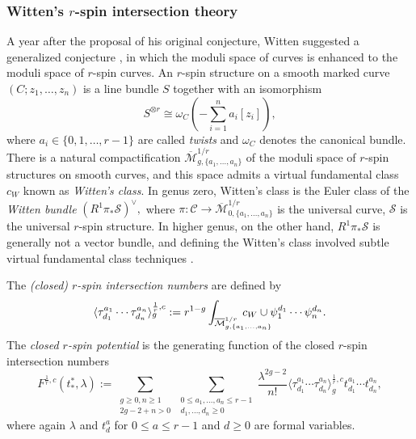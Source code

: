 \documentclass[11pt]{amsart}
\theoremstyle{definition}
\theoremstyle{remark}
\newcommand{\M}{\ensuremath{\overline{\mathcal{M}}}}
\newcommand{\<}{\left<}
\renewcommand{\>}{\right>}
\numberwithin{equation}{section}
\def\Mbar{{\overline{\mathcal M}}}
\begin{document}
\subsubsection{Witten's $r$-spin intersection theory}
A year after the proposal of his original conjecture, Witten suggested a generalized conjecture \cite{Witten93}, in which the moduli space of curves is enhanced to the moduli space of $r$-spin curves.  An $r$-spin structure on a smooth marked curve $(C;z_1, \ldots, z_n)$ is a line bundle $S$ together with an isomorphism
\[S^{\otimes r} \cong \omega_{C}\left(-\sum_{i=1}^n a_i[z_i]\right),\]
where $a_i \in \{0,1,\ldots, r-1\}$ are called \emph{twists} and $\omega_C$ denotes the canonical bundle.  There is a %
natural compactification $\Mbar_{g,\{a_1, \ldots, a_n\}}^{1/r}$ of the %
moduli space of $r$-spin structures on smooth curves, and this space admits a virtual fundamental class $c_W$ known as \emph{Witten's class}. In genus zero, Witten's class is the Euler class of the \emph{Witten bundle} $(R^1\pi_*\mathcal{S})^{\vee},$ where $\pi: \mathcal{C} \rightarrow \Mbar_{0,\{a_1, \ldots, a_n\}}^{1/r}$ is the %
universal curve, $\mathcal{S}$ %
is the universal $r$-spin structure.  In higher genus, on the other hand, $R^1\pi_*\mathcal{S}$ is generally not a vector bundle, and defining the Witten's class involved subtle virtual fundamental class %
techniques \cite{PV,ChiodoWitten,Moc06,FJR,CLL}.

The %
{\it (closed) $r$-spin intersection numbers} are defined by
\begin{gather}\label{eq:closed r-spin}
\langle\tau^{a_1}_{d_1}\cdots\tau^{a_n}_{d_n}\rangle^{\frac{1}{r},c}_g:=r^{1-g}\int_{\M^{1/r}_{g,\{a_1, \ldots, a_n\}}} \hspace{-1cm} c_W \cup \psi_1^{d_1} \cdots \psi_n^{d_n}.
\end{gather}
The \emph{closed $r$-spin potential}
is the generating function of the closed $r$-spin intersection numbers\[
F^{\frac{1}{r},c}(t^*_*,\lambda):=\sum_{\substack{g \geq 0, n \geq 1\\2g-2+n>0}} \sum_{\substack{0 \leq a_1, \ldots, a_n \leq r-1\\ d_1, \ldots, d_n \geq 0}} \frac{\lambda^{2g-2}}{n!}\langle\tau^{a_1}_{d_1}\cdots\tau^{a_n}_{d_n}\rangle^{\frac{1}{r},c}_g t^{a_1}_{d_1} \cdots t^{a_n}_{d_n},
\]
where again $\lambda$ and $t^a_d$  for $0\le a\le r-1$ and $d\ge 0$ are formal variables. 
\end{document}
